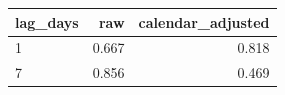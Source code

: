 \begin{tabular}{lrr}
\toprule
lag\_days & raw & calendar\_adjusted \\
\midrule
1 & 0.667 & 0.818 \\
7 & 0.856 & 0.469 \\
\bottomrule
\end{tabular}
